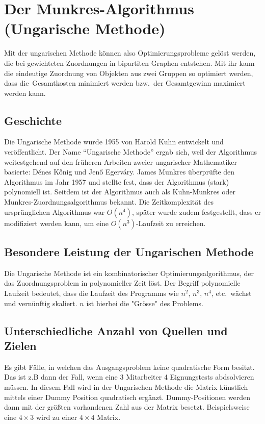 %
%
%
\section{Der Munkres-Algorithmus (Ungarische Methode)
\label{munkres:section:teil3}}

Mit der ungarischen Methode können also Optimierungsprobleme gelöst
werden, die bei gewichteten Zuordnungen in bipartiten Graphen entstehen.
Mit ihr kann die eindeutige Zuordnung von Objekten aus zwei Gruppen so
optimiert werden, dass die Gesamtkosten minimiert werden bzw.~der
Gesamtgewinn maximiert werden kann. 

\subsection{Geschichte
\label{munkres:subsection:malorum}}
Die Ungarische Methode wurde 1955 von Harold Kuhn entwickelt und veröffentlicht.
Der Name ``Ungarische Methode'' ergab sich, weil der Algorithmus
weitestgehend auf den früheren Arbeiten zweier ungarischer Mathematiker
basierte: Dénes Kőnig und Jenő Egerváry.
James Munkres überprüfte den Algorithmus im Jahr 1957 und stellte fest,
dass der Algorithmus (stark) polynomiell ist.
Seitdem ist der Algorithmus auch als Kuhn-Munkres oder
Munkres-Zuordnungsalgorithmus bekannt.
Die Zeitkomplexität des ursprünglichen Algorithmus war $O(n^4)$,
später wurde zudem festgestellt, dass er modifiziert werden kann,
um eine  $O(n^3)$-Laufzeit zu erreichen.

\subsection{Besondere Leistung der Ungarischen Methode
\label{munkres:subsection:malorum}}
Die Ungarische Methode ist ein kombinatorischer Optimierungsalgorithmus, der das Zuordnungsproblem
in polynomieller Zeit löst.
Der Begriff polynomielle Laufzeit bedeutet, dass die Laufzeit des Programms
wie $n^2$, $n^3$, $n^4$, etc.~wächst und vernünftig skaliert. $n$ ist hierbei die "Grösse" des Problems.

\subsection{Unterschiedliche Anzahl von Quellen und Zielen
\label{munkres:subsection:malorum}}
Es gibt Fälle, in welchen das Ausgangsproblem keine quadratische Form besitzt. Das ist z.B dann der Fall, wenn eine 3 Mitarbeiter 4 Eignungstests abdsolvieren müssen. In diesem Fall wird in der Ungarischen Methode die Matrix künstlich mittels einer Dummy Position quadratisch ergänzt. Dummy-Positionen werden dann mit der größten vorhandenen Zahl aus der Matrix besetzt. Beispielsweise eine $4\times 3$ wird zu einer $4\times 4$ Matrix.

